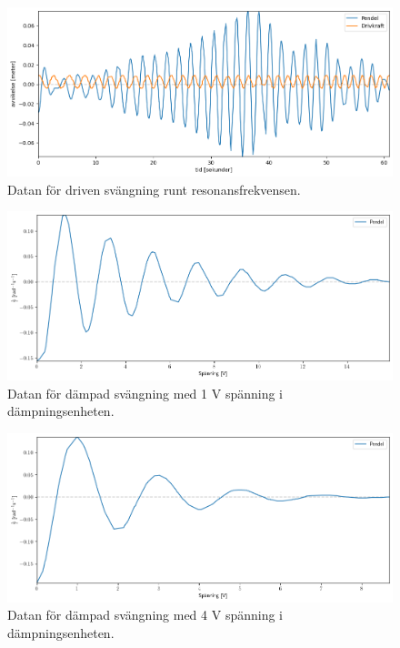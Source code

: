 \documentclass[12pt, a4paper]{article}
\begin{document}
\begin{figure}[hp]
    \includegraphics[width=\textwidth]{graf_resonansfrekvens}
    \caption{Datan för driven svängning runt resonansfrekvensen.}
    \label{fig:data_resonansfrekvens}
\end{figure}

\begin{figure}[hp]
    \includegraphics[width=\textwidth]{graf_1_v_centered}
    \caption{Datan för dämpad svängning med 1 V spänning i dämpningsenheten.}
    \label{fig:data_1_v}
\end{figure}

\begin{figure}[hp]
    \includegraphics[width=\textwidth]{graf_4_v_centered}
    \caption{Datan för dämpad svängning med 4 V spänning i dämpningsenheten.}
    \label{fig:data_4_v}
\end{figure}
\end{document}
